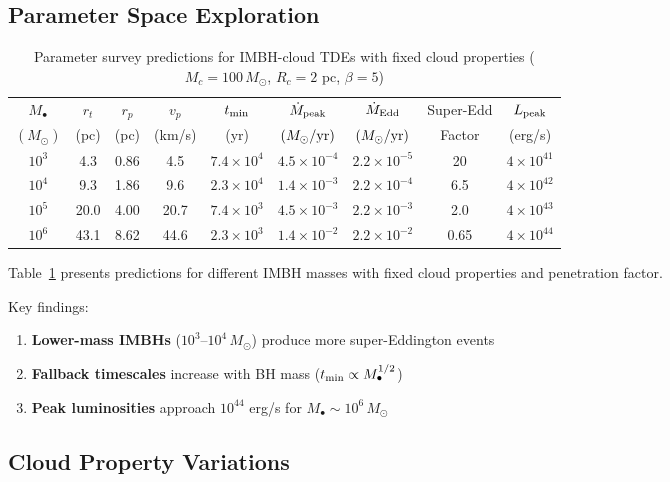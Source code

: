 \documentclass[twocolumn,amsmath,amssymb,prd,superscriptaddress,nofootinbib]{revtex4-2}
\begin{document}
\subsection{Parameter Space Exploration}
\label{sec:param_space}

\begin{table}[t]
\centering
\caption{Parameter survey predictions for IMBH-cloud TDEs with fixed cloud properties ($M_c = 100\,M_\odot$, $R_c = 2$ pc, $\beta = 5$)}
\label{tab:param_survey}
\begin{tabular}{ccccccccc}
\toprule
$M_\bullet$ & $r_t$ & $r_p$ & $v_p$ & $t_{\rm min}$ & $\dot{M}_{\rm peak}$ & $\dot{M}_{\rm Edd}$ & Super-Edd & $L_{\rm peak}$ \\
$(M_\odot)$ & (pc) & (pc) & (km/s) & (yr) & $(M_\odot/{\rm yr})$ & $(M_\odot/{\rm yr})$ & Factor & (erg/s) \\
\midrule
$10^3$ & 4.3 & 0.86 & 4.5 & $7.4\times 10^4$ & $4.5\times 10^{-4}$ & $2.2\times 10^{-5}$ & 20 & $4\times 10^{41}$ \\
$10^4$ & 9.3 & 1.86 & 9.6 & $2.3\times 10^4$ & $1.4\times 10^{-3}$ & $2.2\times 10^{-4}$ & 6.5 & $4\times 10^{42}$ \\
$10^5$ & 20.0 & 4.00 & 20.7 & $7.4\times 10^3$ & $4.5\times 10^{-3}$ & $2.2\times 10^{-3}$ & 2.0 & $4\times 10^{43}$ \\
$10^6$ & 43.1 & 8.62 & 44.6 & $2.3\times 10^3$ & $1.4\times 10^{-2}$ & $2.2\times 10^{-2}$ & 0.65 & $4\times 10^{44}$ \\
\bottomrule
\end{tabular}
\end{table}

Table~\ref{tab:param_survey} presents predictions for different IMBH masses with fixed cloud properties and penetration factor.

Key findings:
\begin{enumerate}
    \item \textbf{Lower-mass IMBHs} ($10^3$--$10^4\,M_\odot$) produce more super-Eddington events
    \item \textbf{Fallback timescales} increase with BH mass ($t_{\rm min} \propto M_\bullet^{1/2}$)
    \item \textbf{Peak luminosities} approach $10^{44}$ erg/s for $M_\bullet \sim 10^6\,M_\odot$
\end{enumerate}

\subsection{Cloud Property Variations}
\label{sec:cloud_variations}
\end{document}
